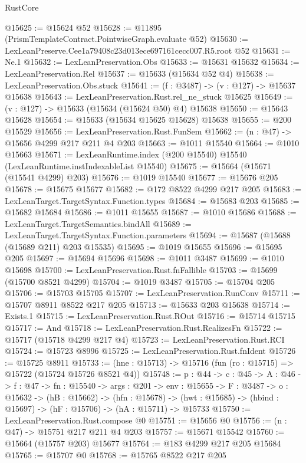\begin{lexlean}{RustCore}
\begin{coremodule}
@15625 := @15624 @52
@15628 := @11895 (PrismTemplateContract.PointwiseGraph.evaluate @52)
@15630 := LexLeanPreserve.Cee1a79408c23d013ece697161cecc007.R5.root @52
@15631 := Ne.{1}
@15632 := LexLeanPreservation.Obs
@15633 := @15631 @15632
@15634 := LexLeanPreservation.Rel
@15637 := @15633 (@15634 @52 @4)
@15638 := LexLeanPreservation.Obs.stuck
@15641 := (f : @3487) -> (v : @127) -> @15637 @15638
@15643 := LexLeanPreservation.Rust.rel_ne_stuck @15625
@15649 := (v : @127) -> @15633 (@15634 (@15624 @50) @4) @15638
@15650 := @15643 @15628
@15654 := @15633 (@15634 @15625 @15628) @15638
@15655 := @200 @15529
@15656 := LexLeanPreservation.Rust.FunSem
@15662 := (n : @47) -> @15656 @4299 @217 @211 @4 @203
@15663 := @1011 @15540
@15664 := @1010 @15663
@15671 := LexLeanRuntime.index (@200 @15540) @15540 (LexLeanRuntime.instIndexableList @15540)
@15675 := @15664 (@15671 (@15541 @4299) @203)
@15676 := @1019 @15540
@15677 := @15676 @205
@15678 := @15675 @15677
@15682 := @172 @8522 @4299 @217 @205
@15683 := LexLeanTarget.TargetSyntax.Function.types
@15684 := @15683 @203
@15685 := @15682 @15684
@15686 := @1011 @15655
@15687 := @1010 @15686
@15688 := LexLeanTarget.TargetSemantics.bindAll
@15689 := LexLeanTarget.TargetSyntax.Function.parameters
@15694 := @15687 (@15688 (@15689 @211) @203 @15535)
@15695 := @1019 @15655
@15696 := @15695 @205
@15697 := @15694 @15696
@15698 := @1011 @3487
@15699 := @1010 @15698
@15700 := LexLeanPreservation.Rust.fnFallible
@15703 := @15699 (@15700 @8521 @4299)
@15704 := @1019 @3487
@15705 := @15704 @205
@15706 := @15703 @15705
@15707 := LexLeanPreservation.RunConv
@15711 := @15707 @8911 @8522 @217 @205
@15713 := @15633 @203 @15638
@15714 := Exists.{1}
@15715 := LexLeanPreservation.Rust.ROut
@15716 := @15714 @15715
@15717 := And
@15718 := LexLeanPreservation.Rust.RealizesFn
@15722 := @15717 (@15718 @4299 @217 @4)
@15723 := LexLeanPreservation.Rust.RCI
@15724 := @15723 @8996
@15725 := LexLeanPreservation.Rust.fnIdent
@15726 := @15725 @8911
@15733 := (hne : @15713) -> @15716 (fun (ro : @15715) => @15722 (@15724 @15726 @8521 @4))
@15748 := {p : @44} ->
  {c : @45} ->
  {A : @46} ->
  {f : @47} ->
  {fn : @15540} ->
  {args : @201} ->
  {env : @15655} ->
  {F : @3487} ->
  {o : @15632} ->
  (hB : @15662) ->
  (hfn : @15678) -> (hwt : @15685) -> (hbind : @15697) -> (hF : @15706) -> (hA : @15711) -> @15733
@15750 := LexLeanPreservation.Rust.compose @0
@15751 := @15656 @0
@15756 := (n : @47) -> @15751 @217 @211 @4 @203
@15757 := @15671 @15542
@15760 := @15664 (@15757 @203) @15677
@15764 := @183 @4299 @217 @205 @15684
@15765 := @15707 @0
@15768 := @15765 @8522 @217 @205

\end{coremodule}
\end{lexlean}
